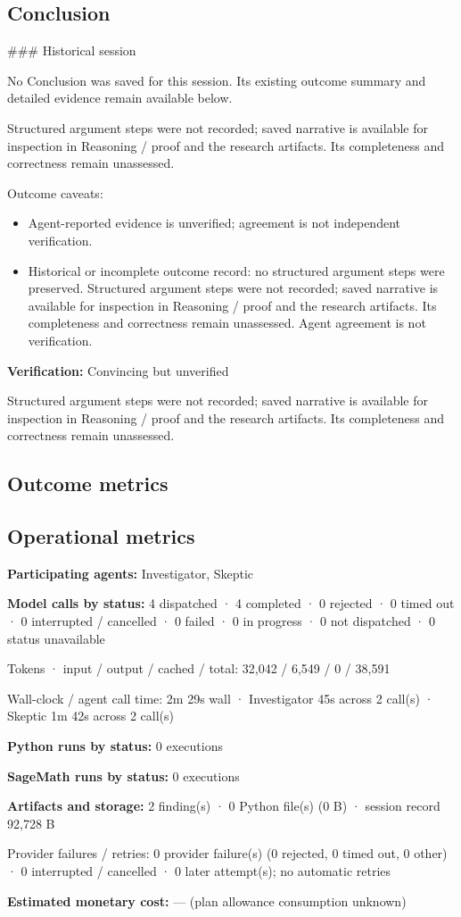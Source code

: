 \documentclass[11pt]{article}
\begin{document}
\subsection{Conclusion}
\#\#\# Historical session

No Conclusion was saved for this session. Its existing outcome summary and detailed evidence remain available below.

Structured argument steps were not recorded; saved narrative is available for inspection in Reasoning / proof and the research artifacts. Its completeness and correctness remain unassessed.\par
Outcome caveats:\par
\begin{itemize}
\item Agent-reported evidence is unverified; agreement is not independent verification.
\item Historical or incomplete outcome record: no structured argument steps were preserved. Structured argument steps were not recorded; saved narrative is available for inspection in Reasoning / proof and the research artifacts. Its completeness and correctness remain unassessed. Agent agreement is not verification.
\end{itemize}
\textbf{Verification:} Convincing but unverified\par
Structured argument steps were not recorded; saved narrative is available for inspection in Reasoning / proof and the research artifacts. Its completeness and correctness remain unassessed.\par
\subsection{Outcome metrics}
\subsection{Operational metrics}
\textbf{Participating agents:} Investigator, Skeptic\par
\textbf{Model calls by status:} 4 dispatched · 4 completed · 0 rejected · 0 timed out · 0 interrupted / cancelled · 0 failed · 0 in progress · 0 not dispatched · 0 status unavailable\par
Tokens · input / output / cached / total: 32,042 / 6,549 / 0 / 38,591\par
Wall-clock / agent call time: 2m 29s wall · Investigator 45s across 2 call(s) · Skeptic 1m 42s across 2 call(s)\par
\textbf{Python runs by status:} 0 executions\par
\textbf{SageMath runs by status:} 0 executions\par
\textbf{Artifacts and storage:} 2 finding(s) · 0 Python file(s) (0 B) · session record 92,728 B\par
Provider failures / retries: 0 provider failure(s) (0 rejected, 0 timed out, 0 other) · 0 interrupted / cancelled · 0 later attempt(s); no automatic retries\par
\textbf{Estimated monetary cost:} — (plan allowance consumption unknown)\par
\end{document}
